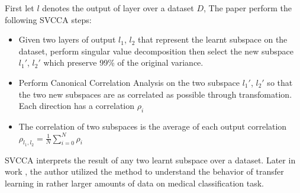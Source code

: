 First let $l$ denotes the output of layer over a dataset $D$, The paper perform the following SVCCA steps:
\begin{itemize}
	\item Given two layers of output $l_{1}$, $l_{2}$ that represent the learnt subspace on the dataset, perform singular value decomposition then select the new subspace $l_{1}'$, $l_{2}'$ which preserve 99\% of the original variance.
	\item Perform Canonical Correlation Analysis on the two subspace $l_{1}'$, $l_{2}'$ so that the two new subspaces are as correlated as possible through transfomation. Each direction has a correlation $\rho_{i}$
	\item The correlation of two subspaces is the average of each output correlation $\rho_{l_{1}, l_{2}} = \frac{1}{N}\sum_{i=0}^{N} \rho_{i}$
\end{itemize}

SVCCA interprets the result of any two learnt subspace over a dataset. Later in work \cite{raghu_transfusion_2019}, the author utilized the method to understand the behavior of transfer learning in rather larger amounts of data on medical classification task.\\
\newpage
